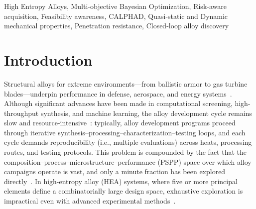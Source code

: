 \documentclass[preprint,12pt,times]{elsarticle}  %
\begin{document}
\begin{frontmatter}
\begin{abstract}
\end{abstract}

\begin{keyword}


High Entropy Alloys, Multi-objective Bayesian Optimization, Risk-aware acquisition, Feasibility awareness, CALPHAD, Quasi-static and Dynamic mechanical properties, Penetration resistance, Closed-loop alloy discovery 

\end{keyword}
\end{frontmatter}
\section{Introduction}\label{sec:Intro}


Structural alloys for extreme environments---from ballistic armor to gas turbine blades---underpin performance in defense, aerospace, and energy systems~\cite{pollock2016alloy, reed2006superalloys, arroyave2022perspective}. Although significant advances have been made in computational screening, high-throughput synthesis, and machine learning, the alloy development cycle remains slow and resource-intensive~\cite{liu2022highthroughput}: typically, alloy development programs proceed through iterative synthesis--processing--characterization--testing loops, and each cycle demands reproducibility (i.e., multiple evaluations) across heats, processing routes, and testing protocols. This problem is compounded by the fact that the composition--process--microstructure--performance (PSPP) space over which alloy campaigns operate is vast, and only a minute fraction has been explored directly~\cite{miracle2017critical}. In high-entropy alloy (HEA) systems, where five or more principal elements define a combinatorially large design space, exhaustive exploration is impractical even with advanced experimental methods~\cite{zhang2014microstructures, cantor2004microstructural}.

\end{document}
